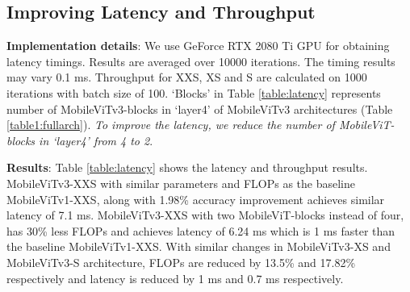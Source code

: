 \documentclass{article} \usepackage{iclr2022_conference,times}
\begin{document}
\subsection{Improving Latency and Throughput} \label{results:latency}

\textbf{Implementation details}: We use GeForce RTX 2080 Ti GPU for obtaining latency timings.
Results are averaged over 10000 iterations. 
The timing results may vary 0.1 ms. 
Throughput for XXS, XS and S are calculated on 1000 iterations with batch size of 100. `Blocks' in Table \ref{table:latency} represents number of MobileViTv3-blocks in `layer4' of MobileViTv3 architectures (Table \ref{table1:fullarch}). \textit{To improve the latency, we reduce the number of MobileViT-blocks in `layer4' from 4 to 2}.

\textbf{Results}: Table \ref{table:latency} shows the latency and throughput results.
MobileViTv3-XXS with similar parameters and FLOPs as the baseline MobileViTv1-XXS, along with 1.98\% accuracy improvement achieves similar latency of 7.1 ms. 
MobileViTv3-XXS with two MobileViT-blocks instead of four, has 30\% less FLOPs and achieves latency of 6.24 ms which is 1 ms faster than the baseline MobileViTv1-XXS. 
With similar changes in MobileViTv3-XS and MobileViTv3-S architecture, FLOPs are reduced by 13.5\% and 17.82\% respectively and latency is reduced by 1 ms and 0.7 ms respectively.
\end{document}

